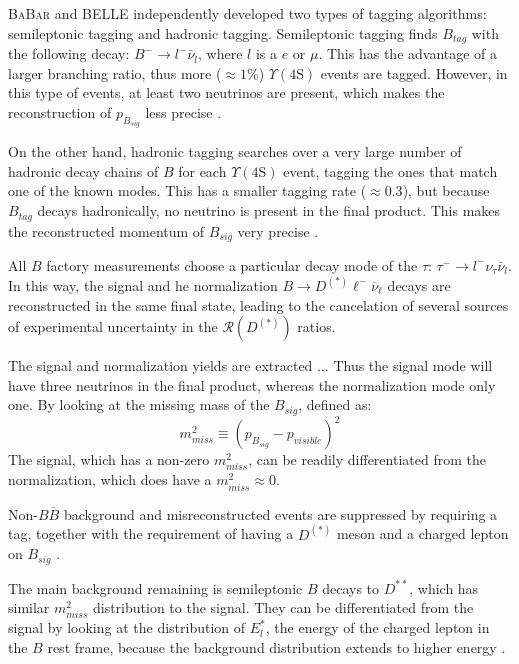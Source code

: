 \documentclass[12pt,letterpaper]{article}
\def\BaBar/{\textsc{BaBar}}
\def\Y4S/{\ensuremath{\Upsilon(\text{4S})}}
\def\RDDst/{\ensuremath{\mathcal{R}(D^{(*)})}}
\begin{document}
\BaBar/ and BELLE independently developed two types of tagging algorithms:
semileptonic tagging and hadronic tagging.
Semileptonic tagging finds $B_{tag}$ with the following decay:
$B^- \rightarrow l^- \bar{\nu}_l$, where $l$ is a $e$ or $\mu$.
This has the advantage of a larger branching ratio, thus more ($\approx 1\%$)
\Y4S/ events are tagged.
However, in this type of events, at least two neutrinos are present, which
makes the reconstruction of $p_{B_{sig}}$ less precise \cite{Ciezarek:2017yzh}.

On the other hand, hadronic tagging searches over a very large number of
hadronic decay chains of $B$ for each \Y4S/ event, tagging the ones that match
one of the known modes.
This has a smaller tagging rate ($\approx 0.3$), but because $B_{tag}$ decays
hadronically, no neutrino is present in the final product.
This makes the reconstructed momentum of $B_{sig}$ very
precise \cite{Lees:2013uzd,Ciezarek:2017yzh}.

All $B$ factory measurements choose a particular decay mode of the $\tau$:
$\tau^- \rightarrow l^- \nu_\tau \bar{\nu}_l$. In this way, the signal and
he normalization $B \rightarrow D^{(*)} \ell^- \overline{\nu}_\ell$ decays
are reconstructed in the same final state, leading to the cancelation of 
several sources of experimental uncertainty in the \RDDst/ ratios.

The signal and normalization yields are extracted ...
Thus the signal mode will have three neutrinos in the final product,
whereas the normalization mode only one.
By looking at the missing mass of the $B_{sig}$, defined as:
\begin{equation}
    m^2_{miss} \equiv \left(p_{B_{sig}} - p_{visible}\right)^2
\end{equation}
The signal, which has a non-zero $m^2_{miss}$, can be readily differentiated
from the normalization, which does have a $m^2_{miss} \approx 0$.

Non-$B \overline{B}$ background and misreconstructed events are suppressed by
requiring a tag, together with the requirement of having a $D^{(*)}$ meson and a
charged lepton on $B_{sig}$ \cite{Ciezarek:2017yzh}.

The main background remaining is semileptonic $B$ decays to $D^{**}$, which has
similar $m^2_{miss}$ distribution to the signal.
They can be differentiated from the signal by looking at the distribution of
$E^{*}_l$, the energy of the charged lepton in the $B$ rest
frame, because the background distribution extends to higher
energy \cite{Ciezarek:2017yzh}.
\end{document}
